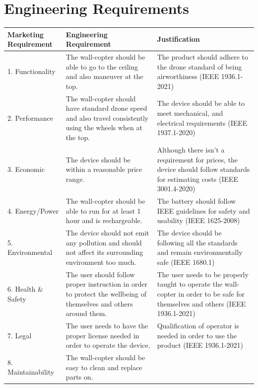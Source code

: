 \documentclass[12pt]{article}
\begin{document}
    \section{Engineering Requirements}
        \begin{longtable}{ | m{4.25cm} | m{5cm}| m{5.4cm} | }
            \hline
            Marketing Requirement & Engineering Requirement & Justification \\\hline
            1. Functionality &
            The wall-copter should be able to go to the ceiling and also maneuver at the top. &
            The product should adhere to the drone standard of being airworthiness (IEEE 1936.1-2021) \\\hline
            2. Performance &
            The wall-copter should have standard drone speed and also travel consistently using the wheels when at the top. &
            The device should be able to meet mechanical, and electrical requirements (IEEE 1937.1-2020) \\\hline
            3. Economic &
            The device should be within a reasonable price range. &
            Although there isn't a requirement for prices, the device should follow standards for estimating costs (IEEE 3001.4-2020)\\\hline
            4. Energy/Power &
            The wall-copter should be able to run for at least 1 hour and is rechargeable. &
            The battery should follow IEEE guidelines for safety and usability (IEEE 1625-2008)\\\hline
            5. Environmental &
            The device should not emit any pollution and should not affect its surrounding environment too much. &
            The device should be following all the standards and remain environmentally safe (IEEE 1680.1) \\\hline
            6. Health \& Safety &
            The user should follow proper instruction in order to protect the wellbeing of themselves and others around them. &
            The user needs to be properly taught to operate the wall-copter in order to be safe for themselves and others (IEEE 1936.1-2021) \\\hline
            7. Legal &
            The user needs to have the proper license needed in order to operate the device. &
            Qualification of operator is needed in order to use the product (IEEE 1936.1-2021) \\\hline
            8. Maintainability &
            The wall-copter should be easy to clean and replace parts on. &

\end{longtable}
\end{document}
